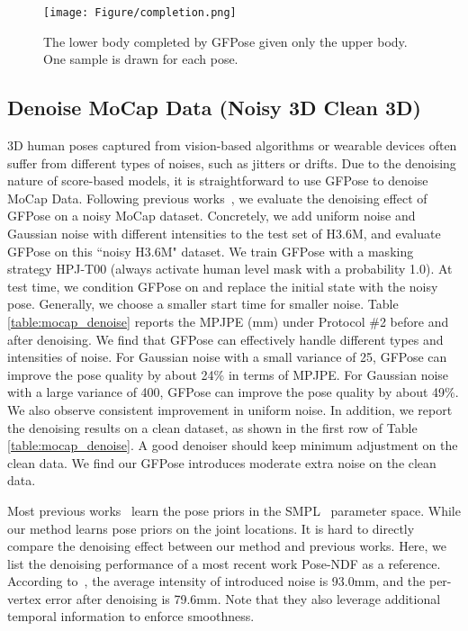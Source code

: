 \documentclass[10pt,twocolumn,letterpaper]{article}
\begin{document}
\begin{figure}[!t]
    \centering
\texttt{[image: Figure/completion.png]}
    \vspace{-0.6em}
    \caption{The \textcolor[RGB]{255,143,163}{lower body} completed by GFPose given only the \textcolor[RGB]{97,165,194}{upper body}. One sample is drawn for each pose.}
    \vspace{-1.5em}
    \label{fig:viz_complete}
\end{figure}


\vspace{-0.1em}
\subsection{Denoise MoCap Data (Noisy 3D  Clean 3D)}
\vspace{-0.2em}
3D human poses captured from vision-based algorithms or wearable devices often suffer from different types of noises, such as jitters or drifts. Due to the denoising nature of score-based models, it is straightforward to use GFPose to denoise MoCap Data. Following previous works~\cite{tiwari2022pose}, we evaluate the denoising effect of GFPose on a noisy MoCap dataset. Concretely, we add uniform noise and Gaussian noise with different intensities to the test set of H3.6M, and evaluate GFPose on this ``noisy H3.6M" dataset. 
We train GFPose with a masking strategy HPJ-T00 (always activate human level mask with a probability 1.0). At test time, we condition GFPose on  and replace the initial state  with the noisy pose. Generally, we choose a smaller start time for smaller noise.
Table \ref{table:mocap_denoise} reports the MPJPE (mm) under Protocol \#2 before and after denoising. We find that GFPose can effectively handle different types and intensities of noise. For Gaussian noise with a small variance of 25, GFPose can improve the pose quality by about 24\% in terms of MPJPE. For Gaussian noise with a large variance of 400, GFPose can improve the pose quality by about 49\%. We also observe consistent improvement in uniform noise. In addition, we report the denoising results on a clean dataset, as shown in the first row of Table \ref{table:mocap_denoise}. A good denoiser should keep minimum adjustment on the clean data. We find our GFPose introduces moderate extra noise on the clean data.

Most previous works~\cite{tiwari2022pose, rempe2021humor, pavlakos2019expressive, davydov2022adversarial} learn the pose priors in the SMPL~\cite{loper2015smpl} parameter space. While our method learns pose priors on the joint locations. It is hard to directly compare the denoising effect between our method and previous works. Here, we list the denoising performance of a most recent work Pose-NDF\cite{tiwari2022pose} as a reference. According to~\cite{tiwari2022pose}, the average intensity of introduced noise is 93.0mm, and the per-vertex error after denoising is 79.6mm. Note that they also leverage additional temporal information to enforce smoothness.
\end{document}
